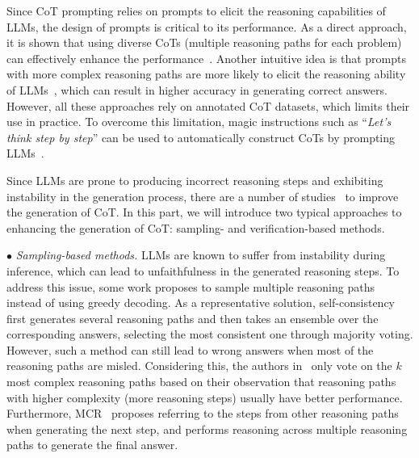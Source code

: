 Since CoT prompting relies on prompts to elicit the reasoning capabilities of LLMs, the design of prompts is critical to its performance.
As a direct approach, it is shown that using diverse CoTs (\ie multiple reasoning paths for each problem) can effectively enhance the performance~\cite{Li-arxiv-2022-On}.
Another intuitive idea is that prompts with more complex reasoning paths are more likely to elicit the reasoning ability of LLMs~\cite{Fu-arxiv-2022-Complexity}, which can result in higher accuracy in generating correct answers.
However, all these approaches rely on annotated CoT datasets, which limits their use in practice. 
To overcome this limitation, magic instructions such as  ``\emph{Let's think step by step}'' can be used to automatically construct CoTs by prompting LLMs~\cite{Zhang-arxiv-2022-Automatic}. 


{
Since LLMs are prone to producing incorrect reasoning steps and exhibiting instability in the generation process, there are a number of studies~\cite{Li-arxiv-2023-Making, Wang-arxiv-2022-Self-Consistency} to improve the generation of CoT.
In this part, we will introduce two typical approaches to enhancing the generation of CoT: sampling- and verification-based methods.
}

$\bullet$ \emph{Sampling-based methods.}
{
LLMs are known to suffer from instability during inference, which can lead to unfaithfulness in the generated reasoning steps.
To address this issue, some work proposes to sample multiple reasoning paths instead of using greedy decoding.
As a representative solution, self-consistency~\cite{Wang-arxiv-2022-Self-Consistency} 
first generates several reasoning paths and then takes an ensemble over the corresponding answers,  selecting the most consistent one through majority voting.
However, such a method can still lead to wrong answers when most of the reasoning paths are misled.
Considering this, the authors in~\cite{Fu-arxiv-2022-Complexity} only vote on the $k$ most complex reasoning paths based on their observation that reasoning paths with higher complexity (\eg more reasoning steps) usually have better performance. 
{Furthermore, MCR~\cite{Yoran-arxiv-2023-Answering} proposes referring to the steps from other reasoning paths when generating the next step, and performs reasoning across multiple reasoning paths to generate the final answer.}
}

